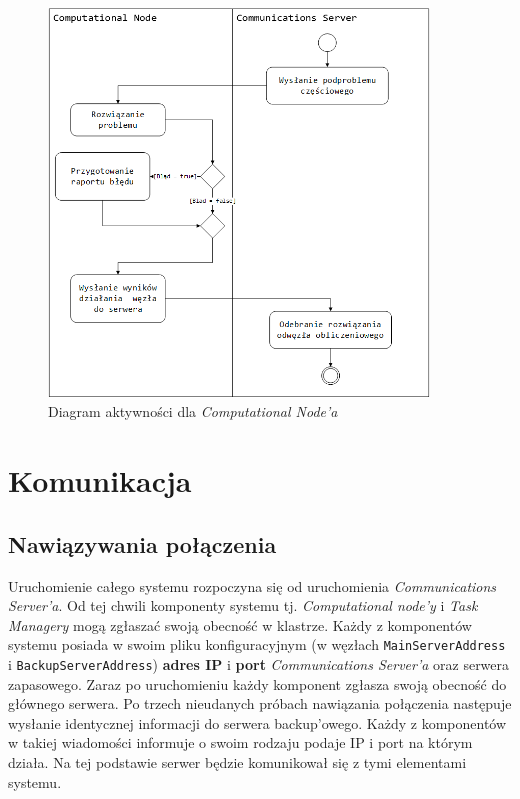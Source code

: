 \documentclass[12pt,a4paper,titlepage]{report}
\begin{document}
	\begin{figure}[h!]
		\centering
		\caption{Diagram aktywności dla \textit{Computational Node'a}}
		\includegraphics[width=0.9\textwidth]{img/diagram3.png}
	\end{figure}
	
	 
	\chapter{Komunikacja}
		\section{Nawiązywania połączenia}
	Uruchomienie całego systemu rozpoczyna się od uruchomienia \textit{Communications Server'a}. Od tej chwili komponenty systemu tj. 
	\textit{Computational node'y}	i \textit{Task Managery} mogą zgłaszać swoją obecność w klastrze. Każdy z komponentów systemu 
	posiada w swoim pliku konfiguracyjnym (w węzłach \verb+MainServerAddress+ i \verb+BackupServerAddress+) \textbf{adres IP} i
	 \textbf{port} \textit{Communications Server'a} oraz serwera zapasowego. Zaraz po uruchomieniu każdy komponent
	zgłasza swoją obecność do głównego serwera. Po trzech nieudanych próbach nawiązania połączenia następuje
	wysłanie identycznej informacji do serwera backup'owego. Każdy z komponentów w takiej wiadomości informuje o swoim rodzaju podaje
	IP i port na którym	działa. Na tej podstawie serwer będzie komunikował się z tymi elementami systemu.\\
	
\end{document}
